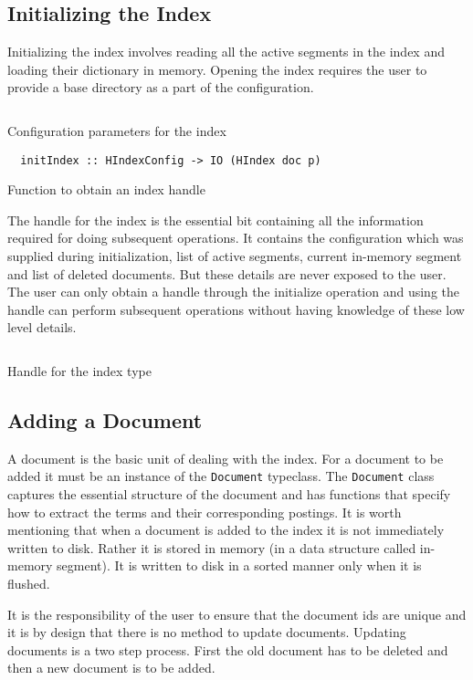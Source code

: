 \subsection{Initializing the Index}
Initializing the index involves reading all the active segments in the index and loading their dictionary in memory.
Opening the index requires the user to provide a base directory as a part of the configuration.
\begin{listing}
\inputminted{haskell}{hs/hconfig.hs}
\caption{Configuration parameters for the index}
\end{listing}

\begin{listing}
\begin{verbatim}
  initIndex :: HIndexConfig -> IO (HIndex doc p)
\end{verbatim}
\caption{Function to obtain an index handle}
\end{listing}

The handle for the index is the essential bit containing all the information required for doing subsequent operations.
It contains the configuration which was supplied during initialization, list of active segments,
current in-memory segment and list of deleted documents.
But these details are never exposed to the user.
The user can only obtain a handle through the initialize operation and using the handle can perform subsequent operations without
having knowledge of these low level details.
\begin{listing}
\inputminted{haskell}{hs/hindex.hs}
\caption{Handle for the index type}
\end{listing}

\pagebreak

\subsection{Adding a Document}
A document is the basic unit of dealing with the index. For a document to be added it must be an instance of the \texttt{Document} typeclass.
The \texttt{Document} class captures the essential structure of the document and has functions that specify how to extract the terms and their corresponding postings.
It is worth mentioning that when a document is added to the index it is not immediately written to disk.
Rather it is stored in memory (in a data structure called in-memory segment). It is written to disk in a sorted manner only when it is flushed.

It is the responsibility of the user to ensure that the document ids are unique and it is by design that there is no method to update documents.
Updating documents is a two step process. First the old document has to be deleted and then a new document is to be added.

